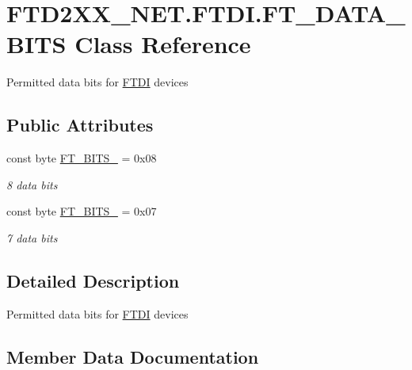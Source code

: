 \hypertarget{class_f_t_d2_x_x___n_e_t_1_1_f_t_d_i_1_1_f_t___d_a_t_a___b_i_t_s}{}\section{F\+T\+D2\+X\+X\+\_\+\+N\+E\+T.\+F\+T\+D\+I.\+F\+T\+\_\+\+D\+A\+T\+A\+\_\+\+B\+I\+TS Class Reference}
\label{class_f_t_d2_x_x___n_e_t_1_1_f_t_d_i_1_1_f_t___d_a_t_a___b_i_t_s}


Permitted data bits for \mbox{\hyperlink{class_f_t_d2_x_x___n_e_t_1_1_f_t_d_i}{F\+T\+DI}} devices  


\subsection*{Public Attributes}
\begin{DoxyCompactItemize}
\item 
const byte \mbox{\hyperlink{class_f_t_d2_x_x___n_e_t_1_1_f_t_d_i_1_1_f_t___d_a_t_a___b_i_t_s_aba9d6c938c4d31337d5a3e2e7b4f5a72}{F\+T\+\_\+\+B\+I\+T\+S\+\_}} = 0x08
\begin{DoxyCompactList}\small\item\em 8 data bits \end{DoxyCompactList}\item 
const byte \mbox{\hyperlink{class_f_t_d2_x_x___n_e_t_1_1_f_t_d_i_1_1_f_t___d_a_t_a___b_i_t_s_a0f10876214fd30d4c0fd787db08320ae}{F\+T\+\_\+\+B\+I\+T\+S\+\_}} = 0x07
\begin{DoxyCompactList}\small\item\em 7 data bits \end{DoxyCompactList}\end{DoxyCompactItemize}


\subsection{Detailed Description}
Permitted data bits for \mbox{\hyperlink{class_f_t_d2_x_x___n_e_t_1_1_f_t_d_i}{F\+T\+DI}} devices 



\subsection{Member Data Documentation}
\mbox{\label{class_f_t_d2_x_x___n_e_t_1_1_f_t_d_i_1_1_f_t___d_a_t_a___b_i_t_s_a0f10876214fd30d4c0fd787db08320ae}} 
